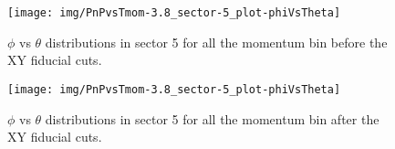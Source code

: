 \begin{figure}[ht]
    \centering
    \texttt{[image: img/PnPvsTmom-3.8\_sector-5\_plot-phiVsTheta]}
    \caption{$\phi$ vs $\theta$ distributions in sector 5 for all the momentum bin before the XY fiducial cuts.}
    \label{fig:phiTheta-before_sector-5}
\end{figure}

\begin{figure}[ht]
    \centering
    \texttt{[image: img/PnPvsTmom-3.8\_sector-5\_plot-phiVsTheta]}
    \caption{$\phi$ vs $\theta$ distributions in sector 5 for all the momentum bin after the XY fiducial cuts.}
    \label{fig:phiTheta-after_sector-5}
\end{figure}




